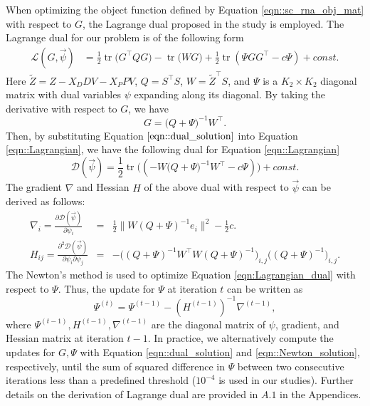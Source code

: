 \documentclass[12pt]{article}
\DeclareMathOperator{\tr}{tr}
\begin{document}
    When optimizing the object function defined by Equation \ref{eqn::sc_rna_obj_mat} with respect to $G$, the Lagrange dual proposed in the study \cite{lee2006efficient} is employed. The Lagrange dual for our problem is of the following form
    \begin{equation*}
      \label{eqn::Lagrangian}
      \begin{split}
        \mathcal{L} (G, \vec{\psi}) & = \frac{1}{2} \tr \big( G^\intercal Q G \big) - \tr \big( W G \big) + \frac{1}{2} \tr(\Psi G G^\intercal - c \Psi) + const.
      \end{split}
    \end{equation*}
    Here $\tilde{Z} = Z - X_D D V - X_P P V $, $Q=S^\intercal S$, $W=\tilde{Z}^\intercal S$, and $\Psi$ is a $K_2 \times K_2$ diagonal matrix with dual variables $\psi$ expanding along its diagonal. By taking the derivative with respect to $G$, we have
    \begin{equation}
      \label{eqn::dual_solution}
      G = \big( Q + \Psi \big)^{-1} W^\intercal.
    \end{equation}
    Then, by substituting Equation $\ref{eqn::dual_solution}$ into Equation \ref{eqn::Lagrangian}, we have the following dual for Equation \ref{eqn::Lagrangian}
    \begin{equation}
      \label{eqn:Lagrangian_dual}
      \mathcal{D} (\vec{\psi}) = \frac{1}{2} \tr \big(( - W \big( Q + \Psi \big)^{-1} W^\intercal - c \Psi) \big) + const.
    \end{equation}
    The gradient $\nabla$ and Hessian $H$ of the above dual with respect to $\vec{\psi}$ can be derived as follows:
    \begin{eqnarray*}
      \nabla_i = \frac{\partial \mathcal{D} (\vec{\psi})}{\partial \psi_i} &=& \frac{1}{2} \| W ( Q + \Psi )^{-1} e_i \big\|^2 - \frac{1}{2} c.\\
      H_{ij} = \frac{\partial^2 \mathcal{D} (\vec{\psi})}{\partial \psi_i \partial \psi_j} &=& - \big(( Q + \Psi )^{-1} W^\intercal W ( Q + \Psi )^{-1} \big)_{i, j} \big( ( Q + \Psi )^{-1} \big)_{i,j}.
    \end{eqnarray*}
    The Newton's method is used to optimize Equation \ref{eqn:Lagrangian_dual} with respect to $\Psi$. Thus, the update for $\Psi$ at iteration $t$ can be written as
    \begin{equation}
      \label{eqn::Newton_solution}
      \Psi^{(t)} = \Psi^{(t-1)} - (H^{(t-1)})^{-1} \nabla^{(t-1)}, 
    \end{equation}
    where $\Psi^{(t-1)}, H^{(t-1)}, \nabla^{(t-1)}$ are the diagonal matrix of $\psi$, gradient, and Hessian matrix at iteration $t-1$. In practice, we alternatively compute the updates for $G,\Psi$ with Equation \ref{eqn::dual_solution} and \ref{eqn::Newton_solution}, respectively, until the sum of squared difference in $\Psi$ between two consecutive iterations less than a predefined threshold ($10^{-4}$ is used in our studies). Further details on the derivation of Lagrange dual are provided in $A.1$ in the Appendices.
\end{document}
